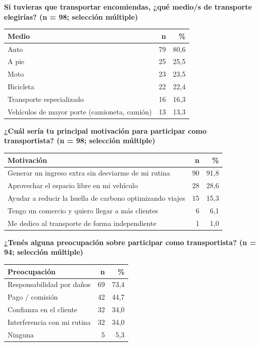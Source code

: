 \bigskip
\noindent\textbf{Si tuvieras que transportar encomiendas, ¿qué medio/s de transporte elegirías? (n = 98; selección múltiple)}

\begin{center}
\begin{tabular}{lrr}
	\toprule
	\textbf{Medio} & \textbf{n} & \textbf{\%} \\
	\midrule
	Auto                                            & 79 & 80,6 \\
	A pie                                           & 25 & 25,5 \\
	Moto                                            & 23 & 23,5 \\
	Bicicleta                                       & 22 & 22,4 \\
	Transporte especializado                        & 16 & 16,3 \\
	Vehículos de mayor porte (camioneta, camión)    & 13 & 13,3 \\
	\bottomrule
\end{tabular}
\end{center}

\bigskip
\noindent\textbf{¿Cuál sería tu principal motivación para participar como transportista? (n = 98; selección múltiple)}

\begin{center}
\begin{tabular}{lrr}
	\toprule
	\textbf{Motivación} & \textbf{n} & \textbf{\%} \\
	\midrule
	Generar un ingreso extra sin desviarme de mi rutina            & 90 & 91,8 \\
	Aprovechar el espacio libre en mi vehículo                     & 28 & 28,6 \\
	Ayudar a reducir la huella de carbono optimizando viajes       & 15 & 15,3 \\
	Tengo un comercio y quiero llegar a más clientes               &  6 &  6,1 \\
	Me dedico al transporte de forma independiente                 &  1 &  1,0 \\
	\bottomrule
\end{tabular}
\end{center}

\bigskip
\noindent\textbf{¿Tenés alguna preocupación sobre participar como transportista? (n = 94; selección múltiple)}

\begin{center}
\begin{tabular}{lrr}
	\toprule
	\textbf{Preocupación} & \textbf{n} & \textbf{\%} \\
	\midrule
	Responsabilidad por daños    & 69 & 73,4 \\
	Pago / comisión              & 42 & 44,7 \\
	Confianza en el cliente      & 32 & 34,0 \\
	Interferencia con mi rutina  & 32 & 34,0 \\
	Ninguna                      &  5 &  5,3 \\
	\bottomrule
\end{tabular}
\end{center}

